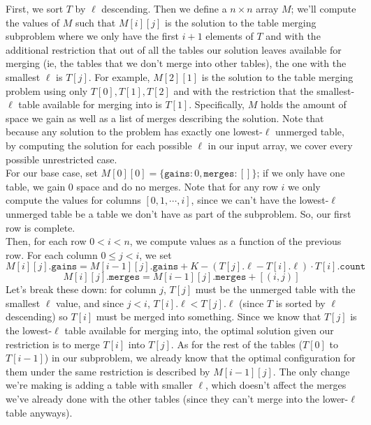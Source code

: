 \documentclass{article}[12]
\begin{document}
First, we sort $T$ by $\ell$ descending. Then we define a $n \times n$ array $M$; we'll compute the values of $M$ such that $M[i][j]$ is the solution to the table merging subproblem where we only have the first $i+1$ elements of $T$ and with the additional restriction that out of all the tables our solution leaves available for merging (ie, the tables that we don't merge into other tables), the one with the smallest $\ell$ is $T[j]$. For example, $M[2][1]$ is the solution to the table merging problem using only $T[0], T[1], T[2]$ and with the restriction that the smallest-$\ell$ table available for merging into is $T[1]$. Specifically, $M$ holds the amount of space we gain as well as a list of merges describing the solution.  Note that because any solution to the problem has exactly one lowest-$\ell$ unmerged table, by computing the solution for each possible $\ell$ in our input array, we cover every possible unrestricted case.\\

For our base case, set $M[0][0] = \{\texttt{gains}: 0, \texttt{merges}: []\}$; if we only have one table, we gain 0 space and do no merges. Note that for any row $i$ we only compute the values for columns $[0, 1, \cdots, i]$, since we can't have the lowest-$\ell$ unmerged table be a table we don't have as part of the subproblem. So, our first row is complete.\\

Then, for each row $0 < i < n$, we compute values as a function of the previous row. For each column $0 \le j < i$, we set
$$M[i][j].\texttt{gains} = M[i-1][j].\texttt{gains} + K - (T[j].\ell - T[i].\ell) \cdot T[i].\texttt{count}$$
$$M[i][j].\texttt{merges} = M[i-1][j].\texttt{merges} + [ (i, j) ]$$
Let's break these down: for column $j$, $T[j]$ must be the unmerged table with the smallest $\ell$ value, and since $j < i$, $T[i].\ell < T[j].\ell$ (since $T$ is sorted by $\ell$ descending) so $T[i]$ must be merged into something. Since we know that $T[j]$ is the lowest-$\ell$ table available for merging into, the optimal solution given our restriction is to merge $T[i]$ into $T[j]$. As for the rest of the tables ($T[0]$ to $T[i-1]$) in our subproblem, we already know that the optimal configuration for them under the same restriction is described by $M[i-1][j]$. The only change we're making is adding a table with smaller $\ell$, which doesn't affect the merges we've already done with the other tables (since they can't merge into the lower-$\ell$ table anyways).\\
\end{document}
